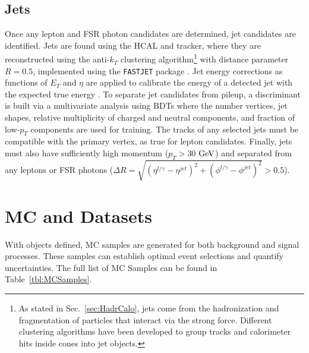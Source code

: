 \subsection{Jets}
\label{sec:zz4lJets}

Once any lepton and FSR photon candidates are determined, jet candidates are identified. Jets are found using the HCAL and tracker, where they are reconstructed using the anti-$k_T$ clustering algorithm\footnote{As stated in Sec.~\ref{sec:HadrCalo}, jets come from the hadronization and fragmentation of particles that interact via the strong force. Different clustering algorithms have been developed to group tracks and calorimeter hits inside cones into jet objects.} \cite{} with distance parameter $R=0.5$, implemented using the {\tt FASTJET} package \cite{}. Jet energy corrections as functions of $E_T$ and $\eta$ are applied to calibrate the energy of a detected jet with the expected true energy \cite{}. To separate jet candidates from pileup, a discriminant is built \cite{} via a multivariate analysis using BDTs where the number vertices, jet shapes, relative multiplicity of charged and neutral components, and fraction of low-$p_T$ components are used for training. The tracks of any selected jets must be compatible with the primary vertex, as true for lepton candidates. Finally, jets must also have sufficiently high momentum ($p_T>30$ $\rm{GeV}$) and separated from any leptons or FSR photons ($\Delta R = \sqrt{(\eta^{l/\gamma}-\eta^{jet})^2 + (\phi^{l/\gamma}-\phi^{jet})^2} > 0.5$).

\section{MC and Datasets}
\label{sec:ZZ4lMCandData}

With objects defined, MC samples are generated for both background and signal processes. These samples can establish optimal event selections and quantify uncertainties. The full list of MC Samples can be found in Table~\ref{tbl:MCSamples}. 

